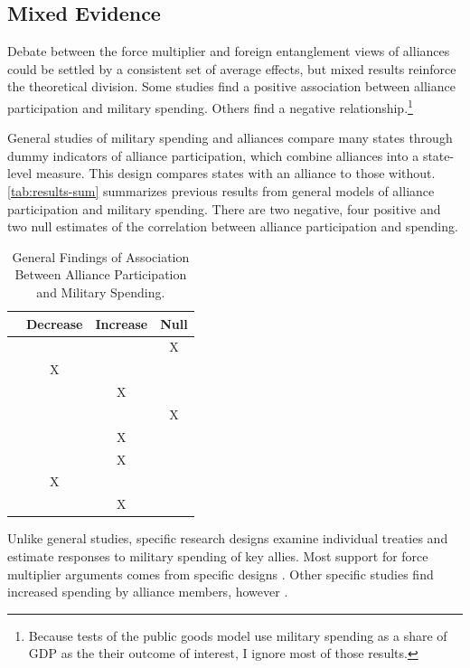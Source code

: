 \documentclass[12pt]{article}
\begin{document}
\subsection{Mixed Evidence} 


Debate between the force multiplier and foreign entanglement views of alliances could be settled by a consistent set of average effects, but mixed results reinforce the theoretical division.
Some studies find a positive association between alliance participation and military spending. 
Others find a negative relationship.\footnote{
Because tests of the public goods model use military spending as a share of GDP as the their outcome of interest, I ignore most of those results.} 


General studies of military spending and alliances compare many states through dummy indicators of alliance participation, which combine alliances into a state-level measure. 
This design compares states with an alliance to those without.
\autoref{tab:results-sum} summarizes previous results from general models of alliance participation and military spending. 
There are two negative, four positive and two null estimates of the correlation between alliance participation and spending. 


\begin{table}[hbt!]
\begin{center}
\begin{tabular}{lccc}
     & Decrease & Increase & Null \\
\hline
\citet{MostSiverson1987} &  &  & X \\
\citet{Conybeare1994} & X & &  \\
\citet{Diehl1994} &  & X &  \\
\citet{Goldsmith2003} &  &  & X \\
\citet{MorganPalmer2006} &  & X & \\ 
\citet{QuirozFlores2011} &  & X &  \\ 
\citet{DigiuseppePoast2016} & X &  & \\ 
\citet{Horowitzetal2017} &  & X & \\ 
\hline
\end{tabular}
\caption{General Findings of Association Between Alliance Participation and Military Spending.}
\label{tab:results-sum}
\end{center} 
\end{table}


Unlike general studies, specific research designs examine individual treaties and estimate responses to military spending of key allies. 
Most support for force multiplier arguments comes from specific designs \citep{BarnettLevy1991, Morrow1993, Sorokin1994, PluemperNeumayer2015}.
Other specific studies find increased spending by alliance members, however \citep{ConybeareSandler1990, Chenetal1996}. 
\end{document}
